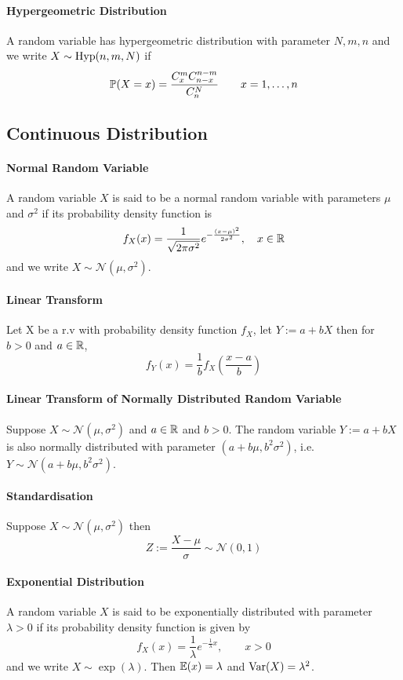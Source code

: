 \paragraph{Hypergeometric Distribution}
A random variable has hypergeometric distribution with parameter \(N,m,n\) and we write \(X \sim \mathrm{Hyp}(n,m,N)\) if 
\[\mathbb{P}(X = x) = \frac{C_x^m C_{n-x}^{n-m}}{C_n^N} \qquad x = 1,\dots,n\]

\subsection{Continuous Distribution}
\paragraph{Normal Random Variable}
A random variable \(X\) is said to be a normal random variable with parameters \(\mu\) and \(\sigma^2\) if its probability density function is 
\[f_X(x) = \frac{1}{\sqrt{2\pi\sigma^2}}e^{-\frac{(x-\mu)^2}{2\sigma^2}}, \quad x \in \mathbb{R}\]
and we write \(X \sim \mathcal{N}(\mu, \sigma^2)\).

\paragraph{Linear Transform}
Let X be a r.v with probability density function \(f_X\), let \(Y := a + bX\) then for \(b > 0\) and \(a \in \mathbb{R}\),
\[f_Y(x) = \frac{1}{b}f_X\left(\frac{x-a}{b}\right)\]

\paragraph{Linear Transform of Normally Distributed Random Variable}
Suppose \(X \sim \mathcal{N}(\mu, \sigma^2)\) and \(a \in \mathbb{R}\) and \(b > 0\). The random variable \(Y := a + bX\) is also normally distributed with parameter \((a + b\mu, b^2\sigma^2)\), i.e. \(Y \sim \mathcal{N}(a + b\mu, b^2\sigma^2)\).

\paragraph{Standardisation}
Suppose \(X \sim \mathcal{N}(\mu, \sigma^2)\) then
\[Z := \frac{X - \mu}{\sigma} \sim \mathcal{N}(0,1)\]

\paragraph{Exponential Distribution}
A random variable \(X\) is said to be exponentially distributed with parameter \(\lambda > 0\) if its probability density function is given by 
\[f_X(x) = \frac{1}{\lambda}e^{-\frac{1}{\lambda}x}, \qquad x > 0\]
and we write \(X \sim \exp(\lambda)\). Then \(\mathbb{E}(x) = \lambda\) and \(\mathrm{Var}(X) = \lambda^2\).


